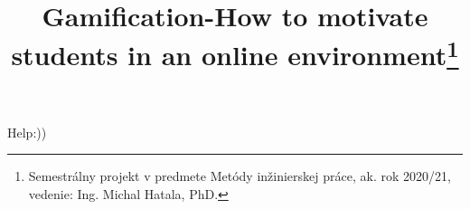 \documentclass[10pt,twoside,slovak,a4paper]{article}
\title{Gamification-How to motivate students in an online environment\thanks{Semestrálny projekt v predmete Metódy inžinierskej práce, ak. rok 2020/21, vedenie: Ing. Michal Hatala, PhD.}} %
\begin{document}
Help:))
\end{document}
